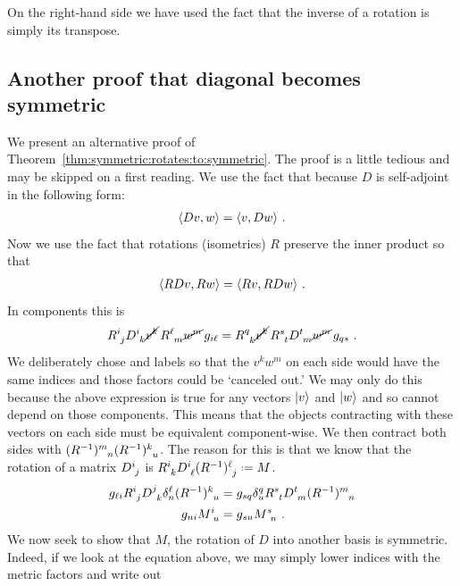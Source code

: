 \documentclass[12pt, oneside]{report}    %
\let\oldsection\section
\def\section{%
  \setcounter{sidenote}{1}%
  \oldsection
}
\begin{document}
On the right-hand side we have used the fact that the inverse of a rotation is simply its transpose. 


\begin{subappendices}
\section{Another proof that diagonal becomes symmetric}
\label{sec:another:proof:diag:is:symmetric}

We present an alternative proof of Theorem~\ref{thm:symmetric:rotates:to:symmetric}. The proof is a little tedious and may be skipped on a first reading.
% 
We use the fact that because $D$ is self-adjoint in the following form:
\begin{align}
    \langle Dv, w \rangle = \langle v, Dw\rangle \ .
\end{align}
Now we use the fact that rotations (isometries) $R$ preserve the inner product so that
\begin{align}
    \langle RDv, Rw \rangle = \langle Rv, RDw \rangle \ .
\end{align}
In components this is
\begin{align}
    R\aij{i}{j}D\aij{i}{k} \cancel{v^k}\,
    R\aij{\ell}{m} \cancel{w^m}\,
    g_{i\ell}
    =
    R\aij{q}{k} \cancel{v^k}\,
    R\aij{s}{t} D\aij{t}{m} \cancel{w^m}\,
    g_{qs} \ .
\end{align}
We deliberately chose and labels so that the $v^kw^m$ on each side would have the same indices and those factors could be `canceled out.' We may only do this because the above expression is true for any vectors $\left|v\right\rangle$ and $\left|w\right\rangle$ and so cannot depend on those components. This means that the objects contracting with these vectors on each side must be equivalent component-wise.  We then contract both sides with $(R\inv)\aij{m}{n}(R\inv)\aij{k}{u}$. The reason for this is that we know that the rotation of a matrix $D\aij{i}{j}$ is $R\aij{i}{k}D\aij{i}{\ell}(R\inv)\aij{\ell}{j}\defeq M$.
\begin{align}
    g_{\ell i} R\aij{i}{j} D\aij{j}{k}\delta^\ell_n
    (R\inv)\aij{k}{u}
    &=
    g_{sq}\delta^q_u R\aij{s}{t} D\aij{t}{m}
    (R\inv)\aij{m}{n}
    \\
    g_{ni} M\aij{i}{u}
    &=
    g_{su} M\aij{s}{n} \ .
\end{align}
We now seek to show that $M$, the rotation of $D$ into another basis is symmetric. Indeed, if we look at the equation above, we may simply lower indices with the metric factors and write out

\end{subappendices}
\end{document}
